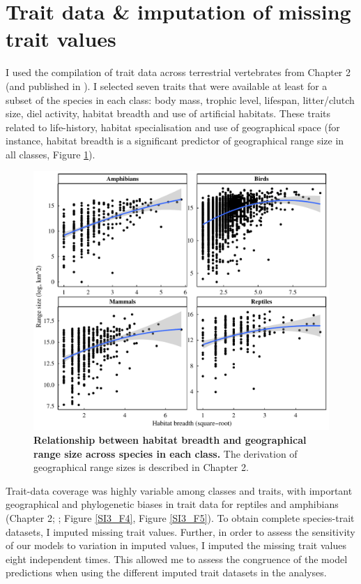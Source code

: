 \pagebreak
\clearpage

\section{Trait data \& imputation of missing trait values}

I used the compilation of trait data across terrestrial vertebrates from Chapter 2 (and published in \citet{Etard2020}). I selected seven traits that were available at least for a subset of the species in each class: body mass, trophic level, lifespan, litter/clutch size, diel activity, habitat breadth and use of artificial habitats. These traits related to life-history, habitat specialisation and use of geographical space (for instance, habitat breadth is a significant predictor of geographical range size in all classes, Figure \ref{SI3_F3}). 

\begin{figure}[h!]
\centering
\includegraphics[scale=0.6]{Supporting/Chapter3/Figures/SI_Rangesize_HB}
\caption[Relationship between habitat breadth and geographical range size across species in each class]{\textbf{Relationship between habitat breadth and geographical range size across species in each class.} The derivation of geographical range sizes is described in Chapter 2.}
\label{SI3_F3}
\end{figure}

Trait-data coverage was highly variable among classes and traits, with important geographical and phylogenetic biases in trait data for reptiles and amphibians (Chapter 2; \cite{Etard2020}; Figure \ref{SI3_F4}, Figure \ref{SI3_F5}). To obtain complete species-trait datasets, I imputed missing trait values. Further, in order to assess the sensitivity of our models to variation in imputed values, I imputed the missing trait values eight independent times. This allowed me to assess the congruence of the model predictions when using the different imputed trait datasets in the analyses. 

